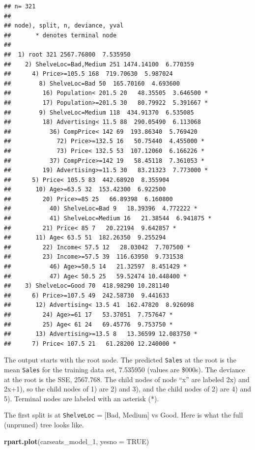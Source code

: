 \documentclass[]{book}
\newenvironment{Shaded}{\begin{snugshade}}{\end{snugshade}}
\newcommand{\DataTypeTok}[1]{\textcolor[rgb]{0.13,0.29,0.53}{#1}}
\newcommand{\DecValTok}[1]{\textcolor[rgb]{0.00,0.00,0.81}{#1}}
\newcommand{\KeywordTok}[1]{\textcolor[rgb]{0.13,0.29,0.53}{\textbf{#1}}}
\newcommand{\NormalTok}[1]{#1}
\newcommand{\OtherTok}[1]{\textcolor[rgb]{0.56,0.35,0.01}{#1}}
\begin{document}
\begin{verbatim}
## n= 321 
## 
## node), split, n, deviance, yval
##       * denotes terminal node
## 
##  1) root 321 2567.76800  7.535950  
##    2) ShelveLoc=Bad,Medium 251 1474.14100  6.770359  
##      4) Price>=105.5 168  719.70630  5.987024  
##        8) ShelveLoc=Bad 50  165.70160  4.693600  
##         16) Population< 201.5 20   48.35505  3.646500 *
##         17) Population>=201.5 30   80.79922  5.391667 *
##        9) ShelveLoc=Medium 118  434.91370  6.535085  
##         18) Advertising< 11.5 88  290.05490  6.113068  
##           36) CompPrice< 142 69  193.86340  5.769420  
##             72) Price>=132.5 16   50.75440  4.455000 *
##             73) Price< 132.5 53  107.12060  6.166226 *
##           37) CompPrice>=142 19   58.45118  7.361053 *
##         19) Advertising>=11.5 30   83.21323  7.773000 *
##      5) Price< 105.5 83  442.68920  8.355904  
##       10) Age>=63.5 32  153.42300  6.922500  
##         20) Price>=85 25   66.89398  6.160800  
##           40) ShelveLoc=Bad 9   18.39396  4.772222 *
##           41) ShelveLoc=Medium 16   21.38544  6.941875 *
##         21) Price< 85 7   20.22194  9.642857 *
##       11) Age< 63.5 51  182.26350  9.255294  
##         22) Income< 57.5 12   28.03042  7.707500 *
##         23) Income>=57.5 39  116.63950  9.731538  
##           46) Age>=50.5 14   21.32597  8.451429 *
##           47) Age< 50.5 25   59.52474 10.448400 *
##    3) ShelveLoc=Good 70  418.98290 10.281140  
##      6) Price>=107.5 49  242.58730  9.441633  
##       12) Advertising< 13.5 41  162.47820  8.926098  
##         24) Age>=61 17   53.37051  7.757647 *
##         25) Age< 61 24   69.45776  9.753750 *
##       13) Advertising>=13.5 8   13.36599 12.083750 *
##      7) Price< 107.5 21   61.28200 12.240000 *
\end{verbatim}

The output starts with the root node. The predicted \texttt{Sales} at the root is the mean \texttt{Sales} for the training data set, 7.535950 (values are \$000s). The deviance at the root is the SSE, 2567.768. The child nodes of node ``x'' are labeled 2x) and 2x+1), so the child nodes of 1) are 2) and 3), and the child nodes of 2) are 4) and 5). Terminal nodes are labeled with an asterisk (*).

The first split is at \texttt{ShelveLoc} = {[}Bad, Medium{]} vs Good. Here is what the full (unpruned) tree looks like.

\begin{Shaded}
\begin{Highlighting}[]
\KeywordTok{rpart.plot}\NormalTok{(carseats_model_}\DecValTok{1}\NormalTok{, }\DataTypeTok{yesno =} \OtherTok{TRUE}\NormalTok{)}
\end{Highlighting}
\end{Shaded}
\end{document}
